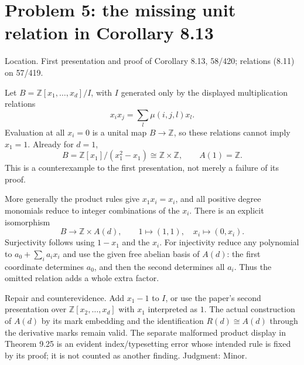 \documentclass[10pt]{article}
\begin{document}
\section*{Problem 5: the missing unit relation in Corollary 8.13}
Location. First presentation and proof of Corollary 8.13, 58/420; relations (8.11) on 57/419.\par
Let \(B=\mathbb Z[x_1,\ldots,x_d]/I\), with \(I\) generated only by the displayed multiplication relations \[x_i x_j=\sum_l\mu(i,j,l)x_l .\] Evaluation at all \(x_i=0\) is a unital map \(B\to\mathbb Z\), so these relations cannot imply \(x_1=1\). Already for \(d=1\), \[B=\mathbb Z[x_1]/(x_1^2-x_1)\cong\mathbb Z\times\mathbb Z,
 \qquad A(1)=\mathbb Z.\] This is a counterexample to the first presentation, not merely a failure of its proof.\par
More generally the product rules give \(x_1x_i=x_i\), and all positive degree monomials reduce to integer combinations of the \(x_i\). There is an explicit isomorphism \[B\longrightarrow \mathbb Z\times A(d),\qquad
 1\longmapsto(1,1),\quad x_i\longmapsto(0,x_i).\] Surjectivity follows using \(1-x_1\) and the \(x_i\). For injectivity reduce any polynomial to \(a_0+\sum_i a_i x_i\) and use the given free abelian basis of \(A(d)\): the first coordinate determines \(a_0\), and then the second determines all \(a_i\). Thus the omitted relation adds a whole extra factor.\par
Repair and counterevidence. Add \(x_1-1\) to \(I\), or use the paper’s second presentation over \(\mathbb Z[x_2,\ldots,x_d]\) with \(x_1\) interpreted as \(1\). The actual construction of \(A(d)\) by its mark embedding and the identification \(R(d)\cong A(d)\) through the derivative marks remain valid. The separate malformed product display in Theorem 9.25 is an evident index/typesetting error whose intended rule is fixed by its proof; it is not counted as another finding. Judgment: Minor.\par
\end{document}
